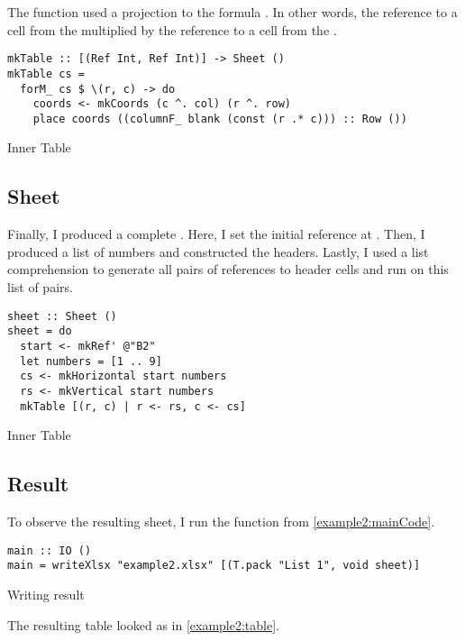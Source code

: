 The  function used a projection to the formula .
In other words, the reference to a cell from the \vh multiplied by the reference to a cell from the \hh.

\begin{listing}[!h]
  \begin{verbatim}
mkTable :: [(Ref Int, Ref Int)] -> Sheet ()
mkTable cs =
  forM_ cs $ \(r, c) -> do
    coords <- mkCoords (c ^. col) (r ^. row)
    place coords ((columnF_ blank (const (r .* c))) :: Row ())  
\end{verbatim}
  \caption{Inner Table}
  \label{example2:tableCode}
\end{listing}

\subsection{Sheet}

Finally, I produced a complete .
Here, I set the initial reference at .
Then, I produced a list of numbers and constructed the headers.
Lastly, I used a list comprehension to generate all pairs of references to header cells and run  on this list of pairs.

\begin{listing}[!h]
  \begin{verbatim}
sheet :: Sheet ()
sheet = do
  start <- mkRef' @"B2"
  let numbers = [1 .. 9]
  cs <- mkHorizontal start numbers
  rs <- mkVertical start numbers
  mkTable [(r, c) | r <- rs, c <- cs]
\end{verbatim}
  \caption{Inner Table}
  \label{example2:sheetCode}
\end{listing}

\subsection{Result}

To observe the resulting sheet, I run the  function from \cref{example2:mainCode}.

\begin{listing}[!h]
  \begin{verbatim}
main :: IO ()
main = writeXlsx "example2.xlsx" [(T.pack "List 1", void sheet)]
\end{verbatim}
  \caption{Writing result}
  \label{example2:mainCode}
\end{listing}

The resulting table looked as in \cref{example2:table}.